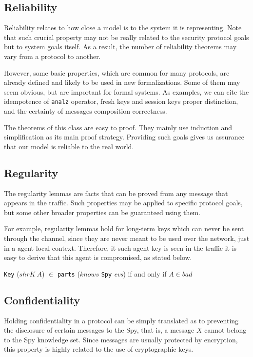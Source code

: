 \subsection{Reliability}
Reliability relates to how close a model is to the system it is representing. Note that such crucial property may not be really related to the security protocol goals but to system goals itself. As a result, the number of reliability theorems may vary from a protocol to another.

However, some basic properties, which are common for many protocols, are already defined and likely to be used in new formalizations. Some of them may seem obvious, but are important for formal systems. As examples, we can cite the idempotence of \texttt{analz} operator, fresh keys and session keys proper distinction, and the certainty of messages composition correctness.

The theorems of this class are easy to proof. They mainly use induction and simplification as its main proof strategy. Providing such goals gives us assurance that our model is reliable to the real world.



\subsection{Regularity}
The regularity lemmas are facts that can be proved from any message that appears in the traffic. Such properties may be applied to specific protocol goals, but some other broader properties can be guaranteed using them.

For example, regularity lemmas hold for long-term keys which can never be sent through the channel, since they are never meant to be used over the network, just in a agent local context. Therefore, it such agent key is seen in the traffic it is easy to derive that this agent is compromised, as stated below.

\begin{center}
  \texttt{Key} ($shrK\ A$) $\in$ \texttt{parts} ($knows$ \texttt{Spy} \textit{evs}) if and only if $A \in bad$
\end{center}



\subsection{Confidentiality}
Holding confidentiality in a protocol can be simply translated as to preventing the disclosure of certain messages to the Spy, that is, a message $X$ cannot belong to the Spy knowledge set. Since messages are usually protected by encryption, this property is highly related to the use of cryptographic keys.

